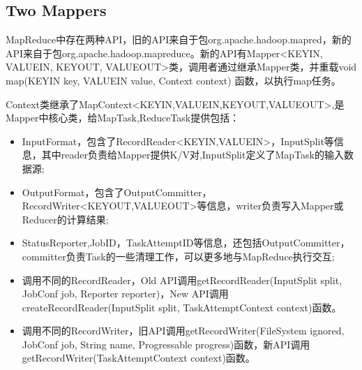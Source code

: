 \subsection{Two Mappers}
\par MapReduce中存在两种API，旧的API来自于包org.apache.hadoop.mapred，新的API来自于包org.apache.hadoop.mapreduce。新的API有Mapper<KEYIN, VALUEIN, KEYOUT, VALUEOUT>类，调用者通过继承Mapper类，并重载void map(KEYIN key, VALUEIN value, Context context) 函数，以执行map任务。
\par Context类继承了MapContext<KEYIN,VALUEIN,KEYOUT,VALUEOUT>,是Mapper中核心类，给MapTask,ReduceTask提供包括：
\begin{itemize}
\item InputFormat，包含了RecordReader<KEYIN,VALUEIN>，InputSplit等信息，其中reader负责给Mapper提供K/V对,InputSplit定义了MapTask的输入数据源;
\item OutputFormat，包含了OutputCommitter，RecordWriter<KEYOUT,VALUEOUT>等信息，writer负责写入Mapper或Reducer的计算结果;
\item StatusReporter,JobID，TaskAttemptID等信息，还包括OutputCommitter，committer负责Task的一些清理工作，可以更多地与MapReduce执行交互;
\item 调用不同的RecordReader，Old API调用getRecordReader(InputSplit split, JobConf job, Reporter reporter)，New API调用createRecordReader(InputSplit split, TaskAttemptContext context)函数。
\item 调用不同的RecordWriter，旧API调用getRecordWriter(FileSystem ignored, JobConf job, String name, Progressable progress)函数，新API调用getRecordWriter(TaskAttemptContext context)函数。
\end{itemize}
